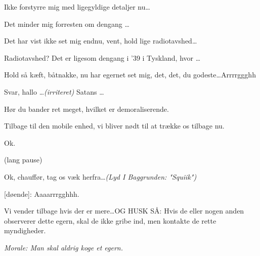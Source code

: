 \documentclass{article}
\begin{document}
\begin{sketch}
 Ikke forstyrre mig med ligegyldige detaljer nu\ldots 

 Det minder mig forresten om dengang \ldots

 Det har vist ikke set mig endnu, vent, hold lige
radiotavshed\ldots

 Radiotavshed? Det er ligesom dengang i '39 i Tyskland,
hvor \ldots

 Hold så kæft, båtnakke, nu har egernet set mig, det,
det, du go\-de\-ste\ldots Arrrrggghh

 Svar, hallo \ldots {\em(irriteret)} Satans \ldots 

 Hør du bander ret meget, hvilket er demoraliserende.

 Tilbage til den mobile enhed, vi bliver nødt til at
trække os tilbage nu.

 Ok.

\scene (lang pause)

 Ok, chauffør, tag os væk herfra\ldots {\em (Lyd I
  Baggrunden: "Squiik")}

[døende]: Aaaarrrgghhh.

 Vi vender tilbage hvis der er mere\ldots  OG HUSK SÅ:
Hvis de eller nogen anden observerer dette egern, skal de ikke gribe ind,
men kontakte de rette myndigheder.

\end{sketch}

{\sl Morale: Man skal aldrig koge et egern.}
\end{document}
